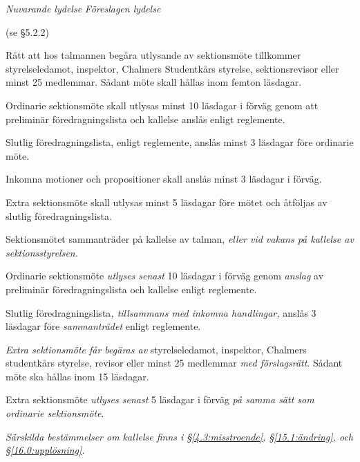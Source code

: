 \documentclass{article}
\newenvironment{lydelse}
    {\begin{paracol}{2}%
        \emph{Nuvarande lydelse}%
        \switchcolumn%
        \emph{Föreslagen lydelse}%
    \end{paracol}%
    \begin{enumerate}[label=\thesubsection.\arabic*]%
    \begin{paracol}{2}%
    }{\end{paracol}\end{enumerate}}
\begin{document}
\begin{lydelse}
  \setcounter{subsection}{3}
  \item[] (se \S 5.2.2)
  \item Rätt att hos talmannen begära utlysande av
    sek\-tions\-möte tillkommer styrelseledamot, inspektor,  Chalmers Studentkårs styrelse, sek\-ti\-ons\-revisor  eller minst 25 medlemmar. Sådant möte skall hållas inom femton läsdagar.

  \item Ordinarie sektionsmöte skall utlysas minst 10 läsdagar i
    förväg genom att preliminär föredragningslista och kallelse an\-slås enligt
    reglemente. 
    
  \item Slutlig föredragningslista, enligt reglemente, anslås minst 3 läsdagar före ordinarie möte. 
    
  \item Inkomna motioner och propositioner skall anslås
    minst 3 läsdagar i förväg.
    
  \item Extra sektionsmöte skall utlysas minst 5 läsdagar före mötet
    och åt\-följ\-as av slutlig föredragningslista.

\switchcolumn
  \item Sektionsmötet sammanträder på kallelse av talman, \emph{eller vid vakans på kallelse av sektionsstyrelsen.}

  \item Ordinarie sektionsmöte \emph{utlyses senast} 10 läsdagar i förväg genom \emph{anslag} av preliminär föredragningslista och kallelse enligt reglemente.

  \item Slutlig föredragningslista\emph{, tillsammans med inkomna handlingar,} anslås 3 läsdagar före \emph{sammanträdet} enligt reglemente.

  \item \emph{Extra sektionsmöte får begäras av} styrelseledamot, inspektor,
    Chalmers studentkårs styrelse, revisor eller minst 25 medlemmar \emph{med förslagsrätt}.
    Sådant möte ska hållas inom 15 läsdagar.
  
  \item Extra sektionsmöte \emph{utlyses senast} 5 läsdagar i förväg \emph{på samma sätt som ordinarie sektionsmöte}.

  \item \emph{Särskilda bestämmelser om kallelse finns i \S\ref{4.3:misstroende}, \S\ref{15.1:ändring}, och \S\ref{16.0:upplösning}.}
\end{lydelse}
\end{document}
